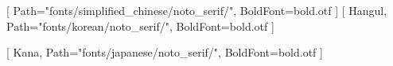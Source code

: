 \usepackage{xeCJK}
[
    Path="fonts/simplified_chinese/noto_serif/",
    BoldFont=bold.otf
]
[
    Hangul,
    Path="fonts/korean/noto_serif/",
    BoldFont=bold.otf
]

[
    Kana,
    Path="fonts/japanese/noto_serif/",
    BoldFont=bold.otf
]
